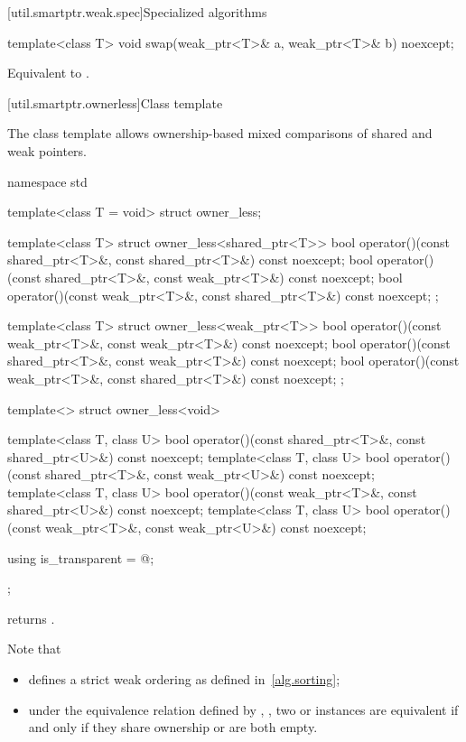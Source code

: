 [util.smartptr.weak.spec]{Specialized algorithms}

%
\begin{itemdecl}
template<class T>
  void swap(weak_ptr<T>& a, weak_ptr<T>& b) noexcept;
\end{itemdecl}

\begin{itemdescr}
\pnum
\effects
Equivalent to .
\end{itemdescr}

[util.smartptr.ownerless]{Class template }

\pnum
The class template  allows ownership-based mixed comparisons of shared
and weak pointers.

%
\begin{codeblock}
namespace std {
  template<class T = void> struct owner_less;

  template<class T> struct owner_less<shared_ptr<T>> {
    bool operator()(const shared_ptr<T>&, const shared_ptr<T>&) const noexcept;
    bool operator()(const shared_ptr<T>&, const weak_ptr<T>&) const noexcept;
    bool operator()(const weak_ptr<T>&, const shared_ptr<T>&) const noexcept;
  };

  template<class T> struct owner_less<weak_ptr<T>> {
    bool operator()(const weak_ptr<T>&, const weak_ptr<T>&) const noexcept;
    bool operator()(const shared_ptr<T>&, const weak_ptr<T>&) const noexcept;
    bool operator()(const weak_ptr<T>&, const shared_ptr<T>&) const noexcept;
  };

  template<> struct owner_less<void> {
    template<class T, class U>
      bool operator()(const shared_ptr<T>&, const shared_ptr<U>&) const noexcept;
    template<class T, class U>
      bool operator()(const shared_ptr<T>&, const weak_ptr<U>&) const noexcept;
    template<class T, class U>
      bool operator()(const weak_ptr<T>&, const shared_ptr<U>&) const noexcept;
    template<class T, class U>
      bool operator()(const weak_ptr<T>&, const weak_ptr<U>&) const noexcept;

    using is_transparent = @\unspec@;
  };
}
\end{codeblock}

%
\pnum
{} returns .
\begin{note}
Note that
\begin{itemize}
\item {} defines a strict weak ordering as defined in~\ref{alg.sorting};

\item under the equivalence relation defined by ,
, two  or
 instances are equivalent if and only if they share ownership or are
both empty.
\end{itemize}
\end{note}

